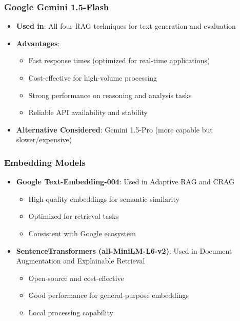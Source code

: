 \documentclass[12pt,a4paper]{article}
\begin{document}
\begin{itemize}
\subsubsection{Google Gemini 1.5-Flash}
\begin{itemize}
    \item \textbf{Used in}: All four RAG techniques for text generation and evaluation
    \item \textbf{Advantages}: 
    \begin{itemize}
        \item Fast response times (optimized for real-time applications)
        \item Cost-effective for high-volume processing
        \item Strong performance on reasoning and analysis tasks
        \item Reliable API availability and stability
    \end{itemize}
    \item \textbf{Alternative Considered}: Gemini 1.5-Pro (more capable but slower/expensive)
\end{itemize}

\subsubsection{Embedding Models}
\begin{itemize}
    \item \textbf{Google Text-Embedding-004}: Used in Adaptive RAG and CRAG
    \begin{itemize}
        \item High-quality embeddings for semantic similarity
        \item Optimized for retrieval tasks
        \item Consistent with Google ecosystem
    \end{itemize}
    \item \textbf{SentenceTransformers (all-MiniLM-L6-v2)}: Used in Document Augmentation and Explainable Retrieval
    \begin{itemize}
        \item Open-source and cost-effective
        \item Good performance for general-purpose embeddings
        \item Local processing capability
    \end{itemize}
\end{itemize}


\end{itemize}
\end{document}
